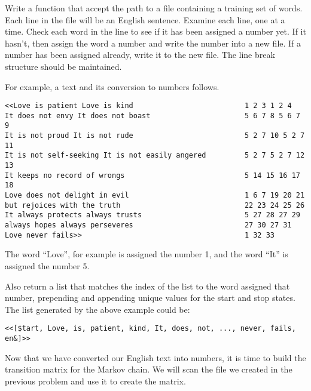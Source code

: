 \begin{problem}

Write a function that accept the path to a file containing a training set of words.
Each line in the file will be an English sentence.
Examine each line, one at a time.
Check each word in the line to see if it has been assigned a number yet.
If it hasn't, then assign the word a number and write the number into a new file.
If a number has been assigned already, write it to the new file.
The line break structure should be maintained.

For example, a text and its conversion to numbers follows.

\begin{lstlisting}
<<Love is patient Love is kind 							1 2 3 1 2 4 
It does not envy It does not boast 						5 6 7 8 5 6 7 9 
It is not proud It is not rude 							5 2 7 10 5 2 7 11 
It is not self-seeking It is not easily angered  		5 2 7 5 2 7 12 13 
It keeps no record of wrongs							5 14 15 16 17 18 
Love does not delight in evil							1 6 7 19 20 21 
but rejoices with the truth 							22 23 24 25 26 
It always protects always trusts 						5 27 28 27 29 
always hopes always perseveres 							27 30 27 31 
Love never fails>> 										1 32 33
\end{lstlisting}

The word ``Love'', for example is assigned the number 1, and the word ``It'' is assigned the number 5.

Also return a list that matches the index of the list to the word assigned that number, prepending and appending unique values for the start and stop states.
The list generated by the above example could be:
\begin{lstlisting}
<<[$tart, Love, is, patient, kind, It, does, not, ..., never, fails, en&]>>
\end{lstlisting}
\end{problem}

Now that we have converted our English text into numbers, it is time to build the transition matrix for the Markov chain.
We will scan the file we created in the previous problem and use it to create the matrix.

